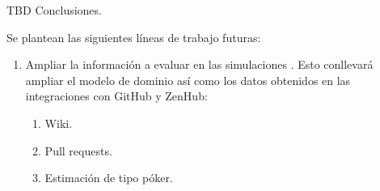 

TBD Conclusiones.

Se plantean las siguientes líneas de trabajo futuras:

\begin{enumerate}
	\item Ampliar la información a evaluar en las simulaciones . Esto conllevará ampliar el modelo de dominio así como los datos obtenidos en las integraciones con GitHub y ZenHub:
	\begin{enumerate}
		\item Wiki.
		\item Pull requests.
		\item Estimación de tipo póker.
	\end{enumerate} 	
\end{enumerate} 
